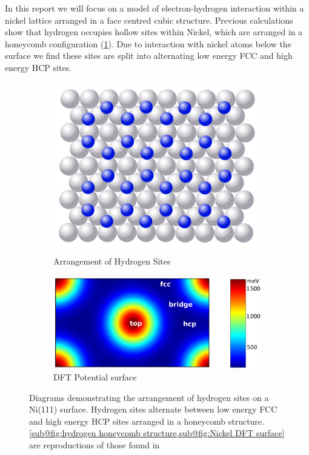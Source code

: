 In this report we will
focus on a model of
electron-hydrogen
interaction within
a nickel lattice arranged
in a
face centred cubic structure.
Previous calculations
show that hydrogen
occupies hollow sites
within Nickel\cite{doi:10.1063/1.522979},
which are arranged in a
honeycomb configuration
(\cref{sub@fig:hydrogen honeycomb structure}).
Due to interaction with nickel
atoms below the surface
we find these sites are split
into alternating low energy
FCC and high energy HCP
sites\cite{Jianding-Zhu}.
\begin{figure}[htbp]
    \centering
    \begin{subfigure}{0.45\linewidth}
        \centering
        \includegraphics[width =0.9 \linewidth]{Figures/Model/Hydrogen sites.png}
        \caption{Arrangement of Hydrogen Sites
        }\label{sub@fig:hydrogen honeycomb structure}
    \end{subfigure}
    \begin{subfigure}{0.45\linewidth}
        \centering
        \includegraphics[width = 0.9\linewidth]{Figures/Model/Hydrogen DFT Potential.png}
        \caption{DFT Potential surface
        }\label{sub@fig:Nickel DFT surface}
    \end{subfigure}
    \caption{
        Diagrams demonstrating
        the arrangement of hydrogen
        sites on a Ni(111) surface.%
        Hydrogen sites alternate
        between low energy FCC and
        high energy HCP sites arranged
        in a honeycomb structure.
        \cref{sub@fig:hydrogen honeycomb structure,sub@fig:Nickel DFT surface}
        are reproductions of those found in\cite{Jianding-Zhu}
    }
\end{figure}
